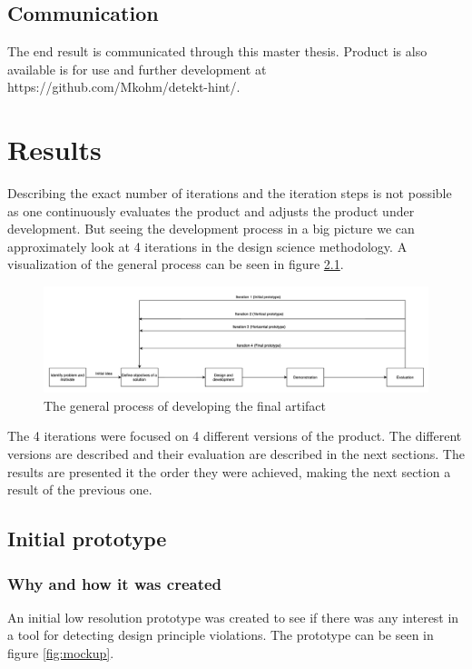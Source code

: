 \documentclass{report}
\begin{document}
\section{Communication}
The end result is communicated through this master thesis. Product is also available is for use and further development at https://github.com/Mkohm/detekt-hint/.

\chapter{Results}
\label{results}
Describing the exact number of iterations and the iteration steps is not possible as one continuously evaluates the product and adjusts the product under development. But seeing the development process in a big picture we can approximately look at 4 iterations in the design science methodology. A visualization of the general process can be seen in figure \ref{fig:workflow}.

\begin{figure}[h!]
    \centering
    \includegraphics[width=\linewidth]{../images/workflow.png}
    \caption{The general process of developing the final artifact}
    \label{fig:workflow}
\end{figure}

The 4 iterations were focused on 4 different versions of the product. The different versions are described and their evaluation are described in the next sections. The results are presented it the order they were achieved, making the next section a result of the previous one.

\section{Initial prototype}

\subsection*{Why and how it was created}
An initial low resolution prototype was created to see if there was any interest in a tool for detecting design principle violations. The prototype can be seen in figure \ref{fig:mockup}.
\end{document}
